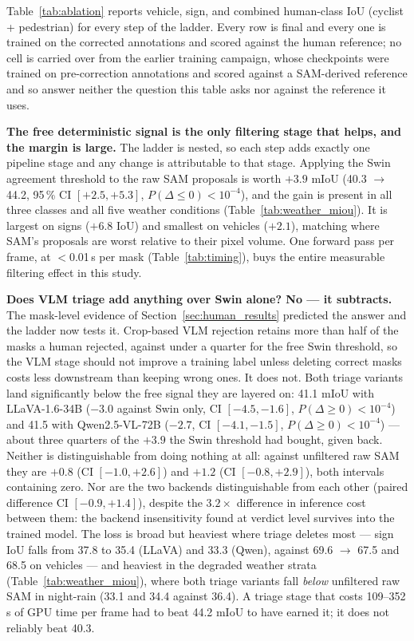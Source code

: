 \documentclass[conference]{IEEEtran}
\begin{document}
Table~\ref{tab:ablation} reports vehicle, sign, and combined human-class IoU (cyclist + pedestrian) for
every step of the ladder. Every row is final and every one is trained on the corrected annotations
and scored against the human reference; no cell is carried over from the earlier training campaign,
whose checkpoints were trained on pre-correction annotations and scored against a SAM-derived
reference and so answer neither the question this table asks nor against the reference it uses.

\textbf{The free deterministic signal is the only filtering stage that helps, and the margin is large.}
The ladder is nested, so each step adds exactly one pipeline stage and any change is attributable to
that stage. Applying the Swin agreement threshold to the raw SAM proposals is worth
$+3.9$ mIoU (40.3 $\to$ 44.2, 95\,\% CI $[+2.5, +5.3]$, $P(\Delta\leq0)<10^{-4}$), and the gain is
present in all three classes and all five weather conditions (Table~\ref{tab:weather_miou}). It is
largest on signs ($+6.8$ IoU) and smallest on vehicles ($+2.1$), matching where SAM's proposals are
worst relative to their pixel volume. One forward pass per frame, at $<$0.01\,s per mask
(Table~\ref{tab:timing}), buys the entire measurable filtering effect in this study.

\textbf{Does VLM triage add anything over Swin alone? No --- it subtracts.}
The mask-level evidence of Section~\ref{sec:human_results} predicted the answer and the ladder now
tests it. Crop-based VLM rejection retains more than half of the masks a human rejected, against under
a quarter for the free Swin threshold, so the VLM stage should not improve a training label unless
deleting correct masks costs less downstream than keeping wrong ones. It does not. Both triage
variants land significantly below the free signal they are layered on: 41.1 mIoU with LLaVA-1.6-34B
($-3.0$ against Swin only, CI $[-4.5, -1.6]$, $P(\Delta\geq0)<10^{-4}$) and 41.5 with Qwen2.5-VL-72B
($-2.7$, CI $[-4.1, -1.5]$, $P(\Delta\geq0)<10^{-4}$) --- about three quarters of the $+3.9$ the Swin
threshold had bought, given back. Neither is distinguishable from doing nothing at all: against
unfiltered raw SAM they are $+0.8$ (CI $[-1.0, +2.6]$) and $+1.2$ (CI $[-0.8, +2.9]$), both intervals
containing zero. Nor are the two backends distinguishable from each other (paired difference CI
$[-0.9, +1.4]$), despite the $3.2\times$ difference in inference cost between them: the backend
insensitivity found at verdict level survives into the trained model.
The loss is broad but heaviest where triage deletes most --- sign IoU falls from 37.8 to 35.4 (LLaVA)
and 33.3 (Qwen), against 69.6 $\to$ 67.5 and 68.5 on vehicles --- and heaviest in the degraded weather
strata (Table~\ref{tab:weather_miou}), where both triage variants fall \emph{below} unfiltered raw SAM
in night-rain (33.1 and 34.4 against 36.4). A triage stage that costs 109--352\,s of GPU time per
frame had to beat 44.2 mIoU to have earned it; it does not reliably beat 40.3.
\end{document}
